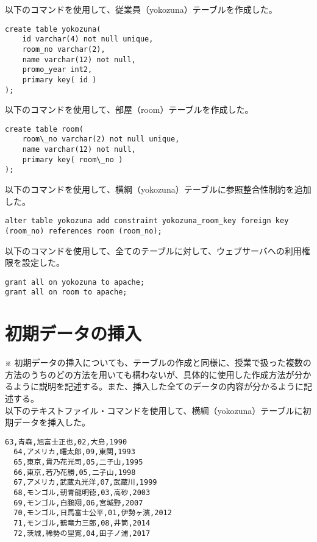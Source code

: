 \documentclass[a4j,12pt]{jreport}
\begin{document}
以下のコマンドを使用して、従業員（yokozuna）テーブルを作成した。

\begin{lstlisting}[caption=従業員テーブルの作成のコマンド]
create table yokozuna(
	id varchar(4) not null unique,
	room_no varchar(2),
	name varchar(12) not null,
	promo_year int2, 
	primary key( id )
);
\end{lstlisting}
\vspace{3mm}

以下のコマンドを使用して、部屋（room）テーブルを作成した。

\begin{lstlisting}[caption=部屋テーブルの作成のコマンド]
create table room(
	room\_no varchar(2) not null unique,
	name varchar(12) not null,
	primary key( room\_no )
);
\end{lstlisting}
\vspace{3mm}

以下のコマンドを使用して、横綱（yokozuna）テーブルに参照整合性制約を追加した。

\begin{lstlisting}[caption=横綱テーブルへの参照整合性制約の設定のコマンド]
alter table yokozuna add constraint yokozuna_room_key foreign key (room_no) references room (room_no);
\end{lstlisting}
\vspace{3mm}

以下のコマンドを使用して、全てのテーブルに対して、ウェブサーバへの利用権限を設定した。

\begin{lstlisting}[caption=従業員・部門テーブルへの利用権限の設定のコマンド]
grant all on yokozuna to apache;
grant all on room to apache;
\end{lstlisting}


\section{初期データの挿入}

※ 初期データの挿入についても、テーブルの作成と同様に、授業で扱った複数の方法のうちのどの方法を用いても構わないが、具体的に使用した作成方法が分かるように説明を記述する。また、挿入した全てのデータの内容が分かるように記述する。\\

以下のテキストファイル・コマンドを使用して、横綱（yokozuna）テーブルに初期データを挿入した。

\begin{lstlisting}[caption=従業員テーブルの初期データ（yokozuna\_data.txt\_list.php）]
  63,青森,旭富士正也,02,大島,1990
  64,アメリカ,曙太郎,09,東関,1993
  65,東京,貴乃花光司,05,二子山,1995
  66,東京,若乃花勝,05,二子山,1998
  67,アメリカ,武蔵丸光洋,07,武蔵川,1999
  68,モンゴル,朝青龍明徳,03,高砂,2003
  69,モンゴル,白鵬翔,06,宮城野,2007
  70,モンゴル,日馬富士公平,01,伊勢ヶ濱,2012
  71,モンゴル,鶴竜力三郎,08,井筒,2014
  72,茨城,稀勢の里寛,04,田子ノ浦,2017
\end{lstlisting}
\end{document}

